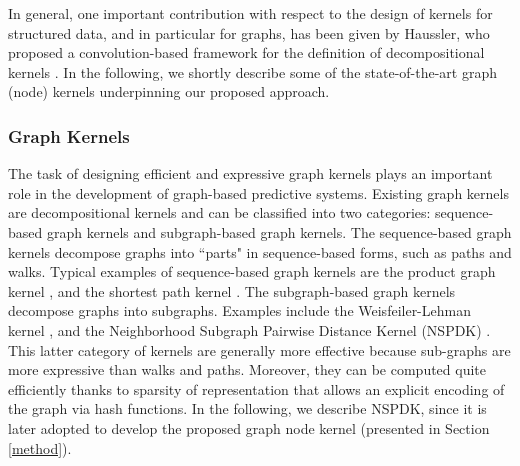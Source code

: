 \documentclass[review]{elsarticle}
\begin{document}
In general, one important contribution with respect to the design of kernels for structured data, and in particular for graphs, has been given by Haussler, who proposed a convolution-based framework for the definition of decompositional kernels \cite{haussler1999convolution}. 
In the following, we shortly describe some of the state-of-the-art graph (node) kernels underpinning our proposed approach.

\subsubsection{Graph Kernels}
\label{graph-kernels}
The task of designing efficient and expressive graph kernels plays an important role in the development of graph-based predictive systems. Existing graph kernels are decompositional kernels and can be classified into two categories: sequence-based graph kernels and subgraph-based graph kernels. The sequence-based graph kernels decompose graphs into ``parts" in sequence-based forms, such as paths and walks. Typical examples of sequence-based graph kernels are the product graph kernel \cite{gartner2003survey}, and the shortest path kernel \cite{borgwardt2005shortest}. The subgraph-based graph kernels decompose graphs into subgraphs. Examples include the Weisfeiler-Lehman kernel \cite{shervashidze2009fast, shervashidze2011weisfeiler}, and the Neighborhood Subgraph Pairwise Distance Kernel (NSPDK) \cite{costa2010fast}. 
This latter category of kernels are generally more effective because sub-graphs are more expressive than walks and paths.
Moreover, they can be computed quite efficiently thanks to sparsity of representation that allows an explicit encoding of the graph via hash functions.
In the following, we describe NSPDK, since it is later adopted to develop the proposed graph node kernel (presented in Section \ref{method}).
\end{document}
